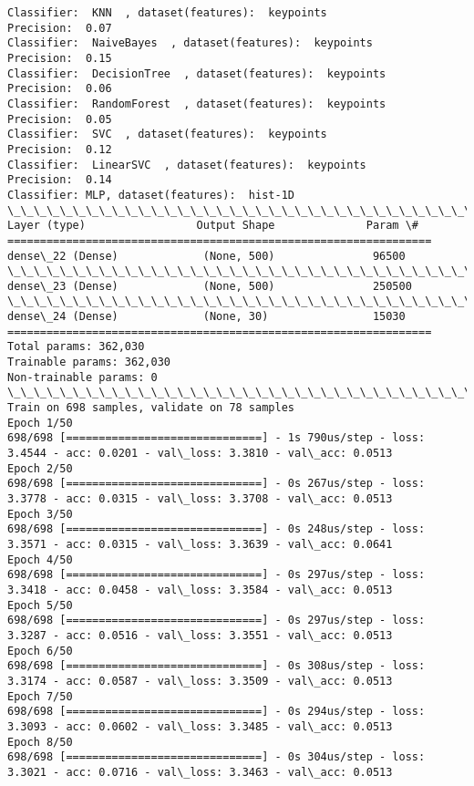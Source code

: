\documentclass[11pt]{article}
\begin{document}
\begin{Verbatim}[commandchars=\\\{\}]
Classifier:  KNN  , dataset(features):  keypoints
Precision:  0.07
Classifier:  NaiveBayes  , dataset(features):  keypoints
Precision:  0.15
Classifier:  DecisionTree  , dataset(features):  keypoints
Precision:  0.06
Classifier:  RandomForest  , dataset(features):  keypoints
Precision:  0.05
Classifier:  SVC  , dataset(features):  keypoints
Precision:  0.12
Classifier:  LinearSVC  , dataset(features):  keypoints
Precision:  0.14
Classifier: MLP, dataset(features):  hist-1D
\_\_\_\_\_\_\_\_\_\_\_\_\_\_\_\_\_\_\_\_\_\_\_\_\_\_\_\_\_\_\_\_\_\_\_\_\_\_\_\_\_\_\_\_\_\_\_\_\_\_\_\_\_\_\_\_\_\_\_\_\_\_\_\_\_
Layer (type)                 Output Shape              Param \#   
=================================================================
dense\_22 (Dense)             (None, 500)               96500     
\_\_\_\_\_\_\_\_\_\_\_\_\_\_\_\_\_\_\_\_\_\_\_\_\_\_\_\_\_\_\_\_\_\_\_\_\_\_\_\_\_\_\_\_\_\_\_\_\_\_\_\_\_\_\_\_\_\_\_\_\_\_\_\_\_
dense\_23 (Dense)             (None, 500)               250500    
\_\_\_\_\_\_\_\_\_\_\_\_\_\_\_\_\_\_\_\_\_\_\_\_\_\_\_\_\_\_\_\_\_\_\_\_\_\_\_\_\_\_\_\_\_\_\_\_\_\_\_\_\_\_\_\_\_\_\_\_\_\_\_\_\_
dense\_24 (Dense)             (None, 30)                15030     
=================================================================
Total params: 362,030
Trainable params: 362,030
Non-trainable params: 0
\_\_\_\_\_\_\_\_\_\_\_\_\_\_\_\_\_\_\_\_\_\_\_\_\_\_\_\_\_\_\_\_\_\_\_\_\_\_\_\_\_\_\_\_\_\_\_\_\_\_\_\_\_\_\_\_\_\_\_\_\_\_\_\_\_
Train on 698 samples, validate on 78 samples
Epoch 1/50
698/698 [==============================] - 1s 790us/step - loss: 3.4544 - acc: 0.0201 - val\_loss: 3.3810 - val\_acc: 0.0513
Epoch 2/50
698/698 [==============================] - 0s 267us/step - loss: 3.3778 - acc: 0.0315 - val\_loss: 3.3708 - val\_acc: 0.0513
Epoch 3/50
698/698 [==============================] - 0s 248us/step - loss: 3.3571 - acc: 0.0315 - val\_loss: 3.3639 - val\_acc: 0.0641
Epoch 4/50
698/698 [==============================] - 0s 297us/step - loss: 3.3418 - acc: 0.0458 - val\_loss: 3.3584 - val\_acc: 0.0513
Epoch 5/50
698/698 [==============================] - 0s 297us/step - loss: 3.3287 - acc: 0.0516 - val\_loss: 3.3551 - val\_acc: 0.0513
Epoch 6/50
698/698 [==============================] - 0s 308us/step - loss: 3.3174 - acc: 0.0587 - val\_loss: 3.3509 - val\_acc: 0.0513
Epoch 7/50
698/698 [==============================] - 0s 294us/step - loss: 3.3093 - acc: 0.0602 - val\_loss: 3.3485 - val\_acc: 0.0513
Epoch 8/50
698/698 [==============================] - 0s 304us/step - loss: 3.3021 - acc: 0.0716 - val\_loss: 3.3463 - val\_acc: 0.0513

\end{Verbatim}
\end{document}
